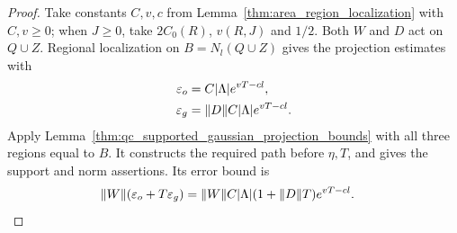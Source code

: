 \begin{proof}\leanok
    Take constants $C,v,c$ from Lemma~\ref{thm:area_region_localization}
    with $C,v\ge0$; when $J\ge0$, take $2C_0(R)$, $v(R,J)$ and $1/2$.
    Both $W$ and $D$ act on $Q\cup Z$. Regional localization on
    $B=N_l(Q\cup Z)$ gives the projection estimates with
    \begin{align}
        \varepsilon_o & =C|\Lambda|e^{vT-cl},\notag      \\
        \varepsilon_g & =\|D\|C|\Lambda|e^{vT-cl}.\notag
    \end{align}
    Apply Lemma~\ref{thm:qc_supported_gaussian_projection_bounds} with all
    three regions equal to $B$. It constructs the required path before
    $\eta,T$, and gives the support and norm assertions. Its error bound is
    \begin{align}
        \|W\|(\varepsilon_o+T\varepsilon_g)
         & =\|W\|C|\Lambda|(1+\|D\|T)e^{vT-cl}.\notag
    \end{align}
\end{proof}
